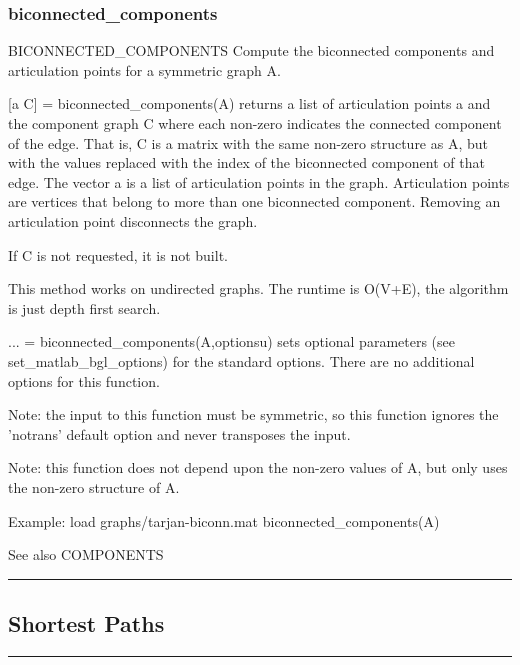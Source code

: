 \subsubsection*{biconnected\_components}
\begin{mcode}
  BICONNECTED_COMPONENTS Compute the biconnected components and
  articulation points for a symmetric graph A.
 
  [a C] = biconnected_components(A) returns a list of articulation points 
  a and the component graph C where each non-zero indicates the connected
  component of the edge.  That is, C is a matrix with the same non-zero
  structure as A, but with the values replaced with the index of the
  biconnected component of that edge.  The vector a is a list of
  articulation points in the graph.  Articulation points are vertices that
  belong to more than one biconnected component.  Removing an articulation
  point disconnects the graph.
 
  If C is not requested, it is not built.
 
  This method works on undirected graphs.
  The runtime is O(V+E), the algorithm is just depth first search.
 
  ... = biconnected_components(A,optionsu) sets optional parameters (see 
  set_matlab_bgl_options) for the standard options.
    There are no additional options for this function.
 
  Note: the input to this function must be symmetric, so this function
  ignores the 'notrans' default option and never transposes the input.
 
  Note: this function does not depend upon the non-zero values of A, but
  only uses the non-zero structure of A.
 
  Example:
     load graphs/tarjan-biconn.mat
     biconnected_components(A)
 
  See also COMPONENTS
\end{mcode}
\newpage
\hrule
\subsection*{Shortest Paths}
\vspace{1cm}
\hrule
